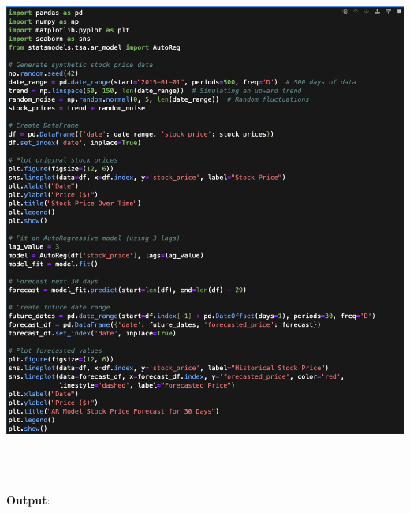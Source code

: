 \documentclass{article}
\begin{document}
\begin{itemize}
\begin{itemize}
\includegraphics[width=14cm,height=18cm]{AR.png}
\newpage
\textbf{Output}:


\end{itemize}
\end{itemize}
\end{document}
